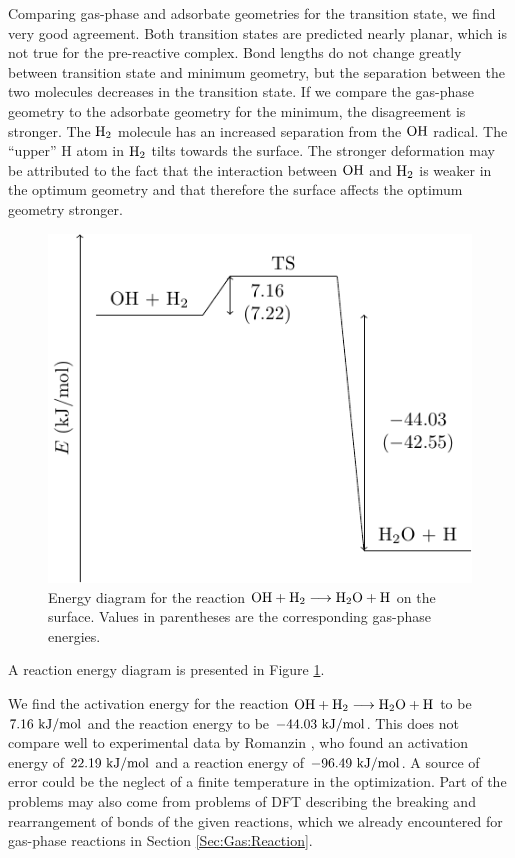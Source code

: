 Comparing gas-phase and adsorbate geometries for the transition state, we find
very good agreement. Both transition states are predicted nearly planar,
which is not true for the pre-reactive complex. Bond lengths do not change
greatly between transition state and minimum geometry, but the separation
between the two molecules decreases in the transition state. If we compare the gas-phase
geometry to the adsorbate geometry for the minimum, the disagreement is
stronger. The $\text H_2$ molecule has an increased separation from the $\text O \text H$
radical. The ``upper'' H atom in $\text H_2$ tilts towards the surface. The stronger
deformation may be attributed to the fact that the interaction between $\text O \text H$ and
$\text H_2$ is weaker in the optimum geometry and that therefore the surface affects
the optimum geometry stronger. 

\begin{figure}[t]
\centering
\includegraphics[width=.8\textwidth]{TikzPics/TikzCreation/HO.H2.Activation/HOH2Activation.pdf}
\caption{Energy diagram for the reaction $\text O \text H + \text H_2 \longrightarrow \text H _2 \text O + \text H$ on
the surface. Values in parentheses are the corresponding gas-phase energies.}
\label{Fig:Adv:ReactionEnergyDiagram}
\end{figure}

A reaction energy diagram is presented in Figure
\ref{Fig:Adv:ReactionEnergyDiagram}.

We find the activation energy for the reaction \mbox{$\text O \text H + \text H_2 \longrightarrow \text H _2 \text O +
\text H$} to be $7.16~\text {kJ/mol}$ and the reaction energy to be $-44.03~\text {kJ/mol}$. This does
not compare well to experimental data by Romanzin
\etal,\cite{RomanzinIoppoloCuppenEtAl2011} who found an activation energy of
$22.19~\text {kJ/mol}$ and a reaction energy of $-96.49~\text {kJ/mol}$. A source of error could be
the neglect of a finite temperature in the optimization. Part of the problems
may also come from problems of DFT describing the breaking and rearrangement of
bonds of the given reactions, which we already encountered for gas-phase
reactions in Section \ref{Sec:Gas:Reaction}.

